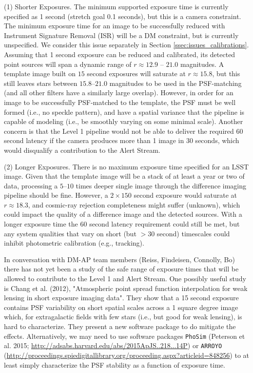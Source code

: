 \documentclass[DM,lsstdraft,toc]{lsstdoc}
\begin{document}
(1) Shorter Exposures. The minimum supported exposure time is currently specified as 1 second (stretch goal 0.1 seconds), but this is a camera constraint. The minimum exposure time for an image to be successfully reduced with Instrument Signature Removal (ISR) will be a DM constraint, but is currently unspecified. We consider this issue separately in Section \ref{ssec:issues_calibrations}. Assuming that 1 second exposure can be reduced and calibrated, its detected point sources will span a dynamic range of $r \approx 12.9$ -- $21.0$ magnitudes. A template image built on $15$ second exposures will saturate at $r \approx 15.8$, but this still leaves stars between $15.8$--$21.0$ magnitudes to be used in the PSF-matching (and all other filters have a similarly large overlap). However, in order for an image to be successfully PSF-matched to the template, the PSF must be well formed (i.e., no speckle pattern), and have a spatial variance that the pipeline is capable of modeling (i.e., be smoothly varying on some minimal scale).  Another concern is that the Level 1 pipeline would not be able to deliver the required $60$ second latency if the camera produces more than 1 image in 30 seconds, which would disqualify a contribution to the Alert Stream.

(2) Longer Exposures. There is no maximum exposure time specified for an LSST image. Given that the template image will be a stack of at least a year or two of data, processing a $5$--$10$ times deeper single image through the difference imaging pipeline should be fine. However, a $2\times150$ second exposure would saturate at $r \approx 18.3$, and cosmic-ray rejection completeness might suffer (unknown), which could impact the quality of a difference image and the detected sources. With a longer exposure time the $60$ second latency requirement could still be met, but any system qualities that vary on short (but $>30$ second) timescales could inhibit photometric calibration (e.g., tracking). 

In conversation with DM-AP team members (Reiss, Findeisen, Connolly, Bo) there has not yet been a study of the safe range of exposure times that will be allowed to contribute to the Level 1 and Alert Stream. One possibly useful study is Chang et al. (2012), "Atmospheric point spread function interpolation for weak lensing in short exposure imaging data". They show that a 15 second exposure contains PSF variability on short spatial scales across a 1 square degree image which, for extragalactic fields with few stars (i.e., but good for weak lensing), is hard to characterize. They present a new software package to do mitigate the effects. Alternatively, we may need to use software packages {\tt PhoSim} (Peterson et al. 2015; \url{http://adsabs.harvard.edu/abs/2015ApJS..218...14P}) or {\tt ARROYO} (\url{http://proceedings.spiedigitallibrary.org/proceeding.aspx?articleid=848256}) to at least simply characterize the PSF stability as a function of exposure time.
\end{document}
